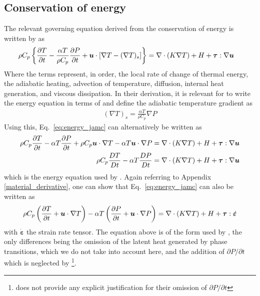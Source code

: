 \documentclass[a4paper]{article}
\newcommand{\mdv}[2]{\frac{D #1}{D #2}}
\begin{document}
\subsection{Conservation of energy}
The relevant governing equation derived from the conservation of energy is written by \textcite{jamc80} as
\begin{align}
    \rho C_p \left\{\pdv{T}{t} - \frac{\alpha T}{\rho C_p}\pdv{P}{t} + \bm{u} \cdot [\nabla T - (\nabla T)_s]\right\} &= 
    \nabla \cdot (K\nabla T) + H + {\bm \tau} : \nabla {\bm u} \label{eq:energy_jamc}
\end{align}
Where the terms represent, in order, the local rate of change of thermal energy, the adiabatic heating, 
advection of temperature, diffusion, internal heat generation, and viscous dissipation. 
In their derivation, it is relevant for \textcite{jamc80} to write the energy equation in terms of and define the adiabatic temperature gradient as
\begin{align*}
    (\nabla T)_s = \frac{\alpha T}{\rho C_p} \nabla P
\end{align*}
Using this, Eq.~\eqref{eq:energy_jamc} can alternatively be written as
\begin{align*}
    \rho C_p \pdv{T}{t} - \alpha T \pdv{P}{t} +\rho C_p \bm{u} \cdot \nabla T - \alpha T \bm{u}\cdot\nabla P &= \nabla \cdot (K\nabla T) + H +  {\bm \tau} : \nabla {\bm u} \\
    \rho C_p \mdv{T}{t} - \alpha T \mdv{P}{t} &= \nabla \cdot (K\nabla T) + H + {\bm \tau} : \nabla {\bm u} 
\end{align*}
which is the energy equation used by \textcite{scto01}. 
Again referring to Appendix \ref{material_derivative}, one can show that Eq.~\eqref{eq:energy_jamc} can also be written as
\begin{align*}
    \rho C_p \left(\frac{\partial T}{\partial t} + {\bm u} \cdot \nabla T\right) - \alpha T\left(\pdv{P}{t}+{\bm u} \cdot \nabla P\right)  
=  \nabla \cdot(K\nabla T) + H + {\bm \tau}: \dot{\bm \varepsilon} 
\end{align*}
with $\dot{\bm \varepsilon}$ the strain rate tensor. The equation above is of the form used by \textcite{gada20}, the only differences being the omission of 
the latent heat generated by phase transitions, which we do not take into account here, and the addition of $\partial{P}/\partial{t}$ which is neglected by 
\textcite{gada20}\footnote{\textcite{gada20}
does not provide any explicit justification for their omission of $\partial{P}/\partial{t}$}.  
\end{document}
